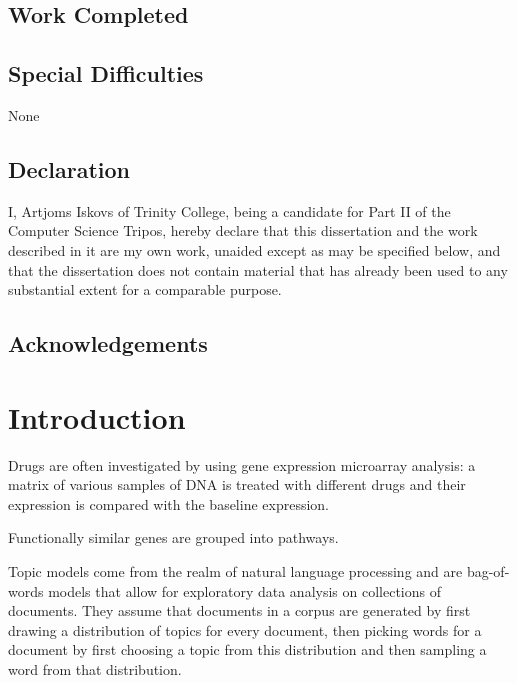 \documentclass[12pt,a4paper,twoside,openright]{report}
\begin{document}
\section*{Work Completed}

\section*{Special Difficulties}
None
 
\newpage
\section*{Declaration}

I, Artjoms Iskovs of Trinity College, being a candidate for Part II of the Computer
Science Tripos, hereby declare that this dissertation and the work described in it are my own work,
unaided except as may be specified below, and that the dissertation does not contain material that has already been used to any substantial
extent for a comparable purpose.

\bigskip
{}

\medskip
{}

\tableofcontents

\listoffigures

\newpage
\section*{Acknowledgements}



\pagestyle{headings}

\chapter{Introduction}

Drugs are often investigated by using gene expression microarray analysis: a matrix of various samples of DNA is treated with different drugs and their expression is compared with the baseline expression.

Functionally similar genes are grouped into pathways.

Topic models come from the realm of natural language processing and are bag-of-words models that allow for exploratory data analysis on collections of documents. They assume that documents in a corpus are generated by first drawing a distribution of topics for every document, then picking words for a document by first choosing a topic from this distribution and then sampling a word from that distribution.
\end{document}
